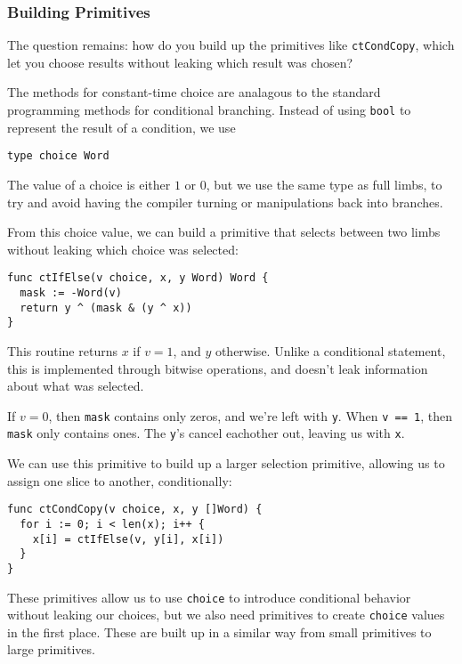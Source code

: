 \documentclass[11pt, a4paper]{article} %
\begin{document}
{\subsubsection{Building Primitives}

The question remains: how do you build up the primitives like
\texttt{ctCondCopy}, which let you choose results without
leaking which result was chosen?

The methods for constant-time choice are analagous to the standard
programming methods for conditional branching. Instead of using
\texttt{bool} to represent the result of a condition, we use

\begin{verbatim}
type choice Word
\end{verbatim}

The value of a choice is either $1$ or $0$, but we use the same
type as full limbs, to try and avoid having the compiler
turning or manipulations back into branches.

From this choice value, we can build a primitive that selects
between two limbs without leaking which choice was selected:

\begin{verbatim}
func ctIfElse(v choice, x, y Word) Word {
  mask := -Word(v)
  return y ^ (mask & (y ^ x))
} 
\end{verbatim}

This routine returns $x$ if $v = 1$, and $y$ otherwise. Unlike
a conditional statement, this is implemented through bitwise operations,
and doesn't leak information about what was selected.

If $v = 0$, then \texttt{mask} contains only zeros, and we're left
with \texttt{y}. When \texttt{v == 1},
then \texttt{mask} only contains ones. The \texttt{y}'s cancel eachother out,
leaving us with \texttt{x}.

We can use this primitive to build up a larger selection primitive,
allowing us to assign one slice to another, conditionally:

\begin{verbatim}
func ctCondCopy(v choice, x, y []Word) {
  for i := 0; i < len(x); i++ {
    x[i] = ctIfElse(v, y[i], x[i])
  }
}
\end{verbatim}

These primitives allow us to use \texttt{choice} to introduce conditional
behavior without leaking our choices, but we also need primitives to
create \texttt{choice} values in the first place. These are built up
in a similar way from small primitives to large primitives.

}
\end{document}
